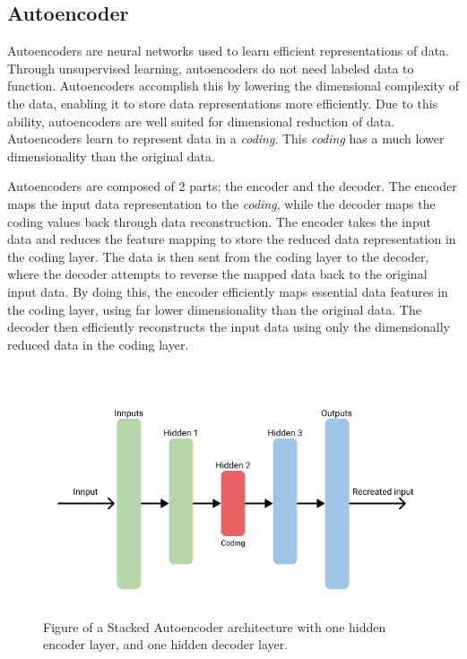 
\subsection{Autoencoder}

Autoencoders are neural networks used to learn efficient representations of data.
Through unsupervised learning, autoencoders do not need labeled data to function.
Autoencoders accomplish this by lowering the dimensional complexity of the data, enabling it to store data representations more efficiently.
Due to this ability, autoencoders are well suited for dimensional reduction of data.
Autoencoders learn to represent data in a \textit{coding}.
This \textit{coding} has a much lower dimensionality than the original data.
\cite[p.~506-508]{Geron2017}

Autoencoders are composed of 2 parts; the encoder and the decoder.
The encoder maps the input data representation to the \textit{coding}, while the decoder maps the coding values back through data reconstruction.
The encoder takes the input data and reduces the feature mapping to store the reduced data representation in the coding layer.
The data is then sent from the coding layer to the decoder, where the decoder attempts to reverse the mapped data back to the original input data.
By doing this, the encoder efficiently maps essential data features in the coding layer, using far lower dimensionality than the original data.
The decoder then efficiently reconstructs the input data using only the dimensionally reduced data in the coding layer.
\cite[p.~506-508]{Geron2017}


\begin{figure}[h!]
    \centering
    \includegraphics[width=\textwidth]{./sections/BT/figures/Autoencoder.png}
    \hfill
    \caption{Figure of a Stacked Autoencoder architecture with one hidden encoder layer, and one hidden decoder layer.}
    \label{fig:stacked_autoencoder_arch}
\end{figure}

